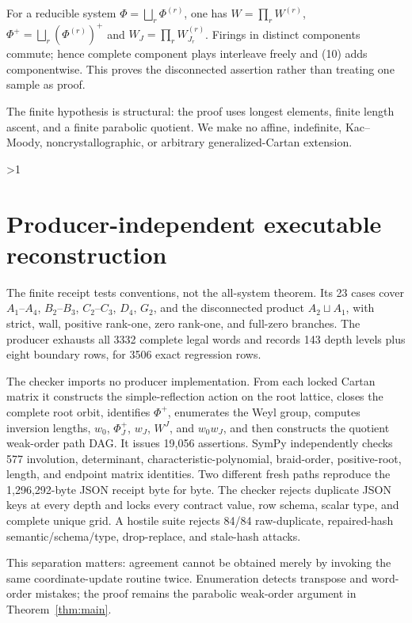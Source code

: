 \documentclass[10pt]{article}
\providecommand{\CRevisionRound}{2}
\begin{document}
For a reducible system $\Phi=\bigsqcup_r\Phi^{(r)}$, one has
$W=\prod_rW^{(r)}$, $\Phi^+=\bigsqcup_r(\Phi^{(r)})^+$ and
$W_J=\prod_rW_{J_r}^{(r)}$.  Firings in distinct components commute; hence
complete component plays interleave freely and (10) adds componentwise.  This
proves the disconnected assertion rather than treating one sample as proof.

The finite hypothesis is structural: the proof uses longest elements, finite
length ascent, and a finite parabolic quotient.  We make no affine,
indefinite, Kac--Moody, noncrystallographic, or arbitrary generalized-Cartan
extension.
\fi

\ifnum\CRevisionRound>1
\section{Producer-independent executable reconstruction}

The finite receipt tests conventions, not the all-system theorem.  Its 23
cases cover $A_1$--$A_4$, $B_2$--$B_3$, $C_2$--$C_3$, $D_4$, $G_2$, and the
disconnected product $A_2\sqcup A_1$, with strict, wall, positive rank-one,
zero rank-one, and full-zero branches.  The producer exhausts all 3332
complete legal words and records 143 depth levels plus eight boundary rows,
for 3506 exact regression rows.

The checker imports no producer implementation.  From each locked Cartan
matrix it constructs the simple-reflection action on the root lattice, closes
the complete root orbit, identifies $\Phi^+$, enumerates the Weyl group,
computes inversion lengths, $w_0$, $\Phi_J^+$, $w_J$, $W^J$, and $w_0w_J$,
and then constructs the quotient weak-order path DAG.  It issues 19,056
assertions.  SymPy independently checks 577 involution, determinant,
characteristic-polynomial, braid-order, positive-root, length, and endpoint
matrix identities.  Two different fresh paths reproduce the 1,296,292-byte
JSON receipt byte for byte.  The checker rejects duplicate JSON keys at every
depth and locks every contract value, row schema, scalar type, and complete
unique grid.  A hostile suite rejects 84/84 raw-duplicate, repaired-hash
semantic/schema/type, drop-replace, and stale-hash attacks.

This separation matters: agreement cannot be obtained merely by invoking the
same coordinate-update routine twice.  Enumeration detects transpose and
word-order mistakes; the proof remains the parabolic weak-order argument in
Theorem~\ref{thm:main}.
\end{document}
